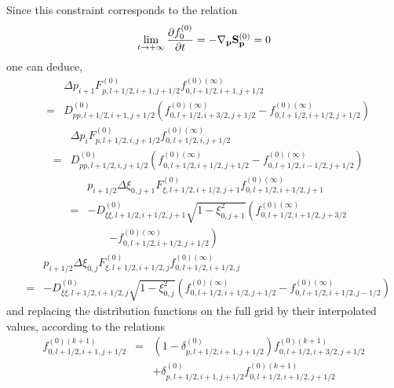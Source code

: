 Since this constraint corresponds to the relation
\begin{equation}
\lim_{t\rightarrow +\infty }\frac{\partial f_{0}^{\left( 0\right) }}{%
\partial t}=-\nabla _{\mathbf{p}}\mathbf{S}_{\mathbf{p}}^{\left( 0\right) }=0
\end{equation}
one can deduce,
\begin{eqnarray}
&&\Delta p_{i+1}F_{p,l+1/2,i+1,j+1/2}^{\left( 0\right)
}f_{0,l+1/2,i+1,j+1/2}^{\left( 0\right) (\infty )}  \nonumber \\
&=&D_{pp,l+1/2,i+1,j+1/2}^{\left( 0\right) }\left(
f_{0,l+1/2,i+3/2,j+1/2}^{\left( 0\right) (\infty
)}-f_{0,l+1/2,i+1/2,j+1/2}^{\left( 0\right) (\infty )}\right)
\end{eqnarray}
\begin{eqnarray}
&&\Delta p_{i}F_{p,l+1/2,i,j+1/2}^{\left( 0\right)
}f_{0,l+1/2,i,j+1/2}^{\left( 0\right) (\infty )}  \nonumber \\
&=&D_{pp,l+1/2,i,j+1/2}^{\left( 0\right) }\left(
f_{0,l+1/2,i+1/2,j+1/2}^{\left( 0\right) (\infty
)}-f_{0,l+1/2,i-1/2,j+1/2}^{\left( 0\right) (\infty )}\right)
\end{eqnarray}
\begin{eqnarray}
&&p_{i+1/2}\Delta \xi _{0,j+1}F_{\xi ,l+1/2,i+1/2,j+1}^{\left( 0\right)
}f_{0,l+1/2,i+1/2,j+1}^{\left( 0\right) (\infty )}  \nonumber \\
&=&-D_{\xi \xi ,l+1/2,i+1/2,j+1}^{\left( 0\right) }\sqrt{1-\xi _{0,j+1}^{2}}%
\left( f_{0,l+1/2,i+1/2,j+3/2}^{\left( 0\right) (\infty
)}\right.\nonumber\\&&\qquad\left.-f_{0,l+1/2,i+1/2,j+1/2}^{\left(
0\right) (\infty )}\right)
\end{eqnarray}
\begin{eqnarray}
&&p_{i+1/2}\Delta \xi _{0,j}F_{\xi ,l+1/2,i+1/2,j}^{\left( 0\right)
}f_{0,l+1/2,i+1/2,j}^{\left( 0\right) (\infty )}  \nonumber \\
&=&-D_{\xi \xi ,l+1/2,i+1/2,j}^{\left( 0\right) }\sqrt{1-\xi _{0,j}^{2}}%
\left( f_{0,l+1/2,i+1/2,j+1/2}^{\left( 0\right) (\infty
)}-f_{0,l+1/2,i+1/2,j-1/2}^{\left( 0\right) (\infty )}\right)
\end{eqnarray}
and replacing the distribution functions on the full grid by their
interpolated values, according to the relations
\begin{eqnarray}
f_{0,l+1/2,i+1,j+1/2}^{\left( 0\right) (k+1)} &=&\left( 1-\delta
_{p,l+1/2,i+1,j+1/2}^{\left( 0\right) }\right)
f_{0,l+1/2,i+3/2,j+1/2}^{\left( 0\right) (k+1)}  \nonumber \\
&&+\delta _{p,l+1/2,i+1,j+1/2}^{\left( 0\right)
}f_{0,l+1/2,i+1/2,j+1/2}^{\left( 0\right) (k+1)}
\end{eqnarray}
